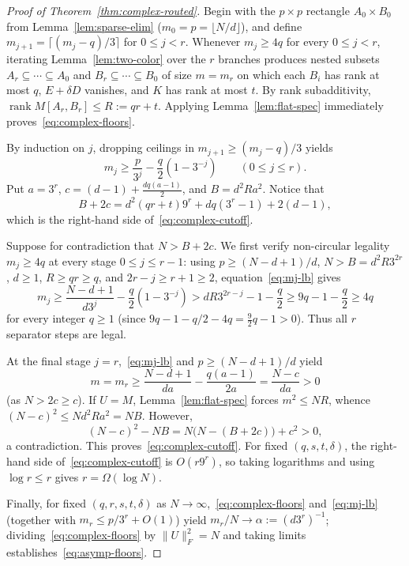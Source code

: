 \documentclass[11pt,reqno]{amsart}
\numberwithin{equation}{section}
\theoremstyle{definition}
\theoremstyle{remark}
\newcommand{\rank}{\operatorname{rank}}
\begin{document}
\begin{proof}[Proof of Theorem~\ref{thm:complex-routed}]
Begin with the $p\times p$ rectangle $A_0\times B_0$ from Lemma~\ref{lem:sparse-elim} ($m_0 = p = \lfloor N/d\rfloor$), and define $m_{j+1} = \lceil(m_j - q)/3\rceil$ for $0\le j<r$. Whenever $m_j\ge 4q$ for every $0\le j<r$, iterating Lemma~\ref{lem:two-color} over the $r$ branches produces nested subsets $A_r\subseteq\cdots\subseteq A_0$ and $B_r\subseteq\cdots\subseteq B_0$ of size $m=m_r$ on which each $B_i$ has rank at most $q$, $E+\delta D$ vanishes, and $K$ has rank at most $t$. By rank subadditivity, $\rank M[A_r,B_r]\le R := qr + t$. Applying Lemma~\ref{lem:flat-spec} immediately proves~\eqref{eq:complex-floors}.

By induction on $j$, dropping ceilings in $m_{j+1}\ge (m_j - q)/3$ yields
\begin{equation}
\label{eq:mj-lb}
m_j \ge \frac{p}{3^j} - \frac{q}{2}(1 - 3^{-j})\qquad (0\le j\le r).
\end{equation}
Put $a = 3^r$, $c = (d-1) + \frac{dq(a-1)}{2}$, and $B = d^2 R a^2$. Notice that
\[
B + 2c = d^2(qr + t)9^r + dq(3^r - 1) + 2(d - 1),
\]
which is the right-hand side of~\eqref{eq:complex-cutoff}.

Suppose for contradiction that $N > B + 2c$. We first verify non-circular legality $m_j\ge 4q$ at every stage $0\le j\le r-1$: using $p \ge (N - d + 1)/d$, $N > B = d^2 R 3^{2r}$, $d\ge 1$, $R\ge qr\ge q$, and $2r - j \ge r + 1\ge 2$, equation~\eqref{eq:mj-lb} gives
\[
m_j \ge \frac{N - d + 1}{d 3^j} - \frac{q}{2}(1 - 3^{-j})
> d R 3^{2r - j} - 1 - \frac{q}{2}
\ge 9q - 1 - \frac{q}{2} \ge 4q
\]
for every integer $q\ge 1$ (since $9q - 1 - q/2 - 4q = \frac{9}{2}q - 1 > 0$). Thus all $r$ separator steps are legal.

At the final stage $j=r$,~\eqref{eq:mj-lb} and $p\ge (N-d+1)/d$ yield
\[
m = m_r \ge \frac{N - d + 1}{da} - \frac{q(a - 1)}{2a} = \frac{N - c}{da} > 0
\]
(as $N > 2c\ge c$). If $U = M$, Lemma~\ref{lem:flat-spec} forces $m^2 \le NR$, whence $(N - c)^2 \le N d^2 R a^2 = NB$. However,
\[
(N - c)^2 - NB = N\bigl(N - (B + 2c)\bigr) + c^2 > 0,
\]
a contradiction. This proves~\eqref{eq:complex-cutoff}. For fixed $(q,s,t,\delta)$, the right-hand side of~\eqref{eq:complex-cutoff} is $O(r9^r)$, so taking logarithms and using $\log r\le r$ gives $r = \Omega(\log N)$.

Finally, for fixed $(q,r,s,t,\delta)$ as $N\to\infty$,~\eqref{eq:complex-floors} and~\eqref{eq:mj-lb} (together with $m_r \le p/3^r + O(1)$) yield $m_r/N\to \alpha := (d3^r)^{-1}$; dividing~\eqref{eq:complex-floors} by $\|U\|_F^2 = N$ and taking limits establishes~\eqref{eq:asymp-floors}.
\end{proof}
\end{document}
